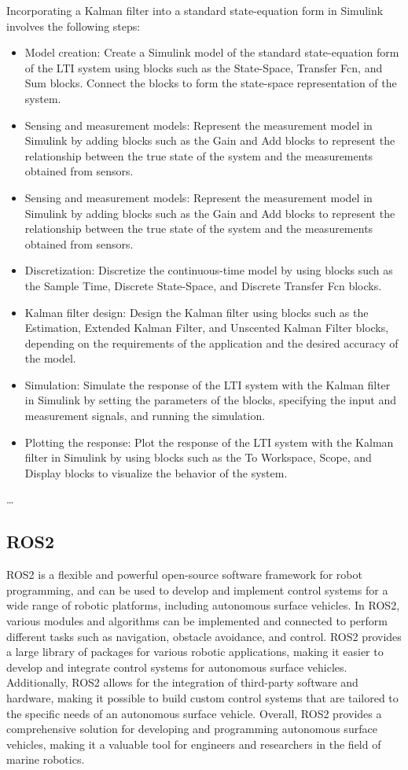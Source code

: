 \documentclass{article}
\begin{document}
Incorporating a Kalman filter into a standard state-equation form in Simulink involves the following steps:
\begin{itemize}
    \item Model creation: Create a Simulink model of the standard state-equation form of the LTI system using blocks such as the State-Space, Transfer Fcn, and Sum blocks. Connect the blocks to form the state-space representation of the system.
    \item Sensing and measurement models: Represent the measurement model in Simulink by adding blocks such as the Gain and Add blocks to represent the relationship between the true state of the system and the measurements obtained from sensors.
    \item Sensing and measurement models: Represent the measurement model in Simulink by adding blocks such as the Gain and Add blocks to represent the relationship between the true state of the system and the measurements obtained from sensors.
    \item Discretization: Discretize the continuous-time model by using blocks such as the Sample Time, Discrete State-Space, and Discrete Transfer Fcn blocks.
    \item Kalman filter design: Design the Kalman filter using blocks such as the Estimation, Extended Kalman Filter, and Unscented Kalman Filter blocks, depending on the requirements of the application and the desired accuracy of the model.
    \item Simulation: Simulate the response of the LTI system with the Kalman filter in Simulink by setting the parameters of the blocks, specifying the input and measurement signals, and running the simulation.
    \item Plotting the response: Plot the response of the LTI system with the Kalman filter in Simulink by using blocks such as the To Workspace, Scope, and Display blocks to visualize the behavior of the system.
\end{itemize}

\ldots

\subsection{ROS2}
ROS2 is a flexible and powerful open-source software framework for robot programming, and can be used to develop and implement control systems for a wide range of robotic platforms, including autonomous surface vehicles. In ROS2, various modules and algorithms can be implemented and connected to perform different tasks such as navigation, obstacle avoidance, and control. ROS2 provides a large library of packages for various robotic applications, making it easier to develop and integrate control systems for autonomous surface vehicles. Additionally, ROS2 allows for the integration of third-party software and hardware, making it possible to build custom control systems that are tailored to the specific needs of an autonomous surface vehicle. Overall, ROS2 provides a comprehensive solution for developing and programming autonomous surface vehicles, making it a valuable tool for engineers and researchers in the field of marine robotics.
\end{document}
